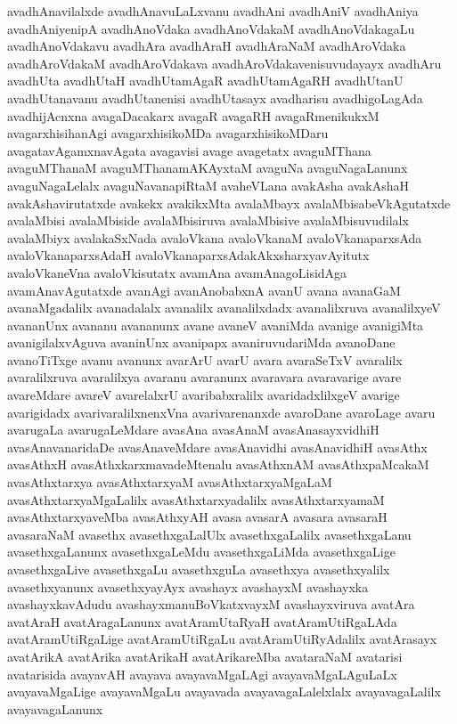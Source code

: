 {avadhAnavilalxde
avadhAnavuLaLxvanu
avadhAni
avadhAniV
avadhAniya
avadhAniyenipA
avadhAnoVdaka
avadhAnoVdakaM
avadhAnoVdakagaLu
avadhAnoVdakavu
avadhAra
avadhAraH
avadhAraNaM
avadhAroVdaka
avadhAroVdakaM
avadhAroVdakava
avadhAroVdakavenisuvudayayx
avadhAru
avadhUta
avadhUtaH
avadhUtamAgaR
avadhUtamAgaRH
avadhUtanU
avadhUtanavanu
avadhUtanenisi
avadhUtasayx
avadharisu
avadhigoLagAda
avadhijAcnxna
avagaDacakarx
avagaR
avagaRH
avagaRmenikukxM
avagarxhisihanAgi
avagarxhisikoMDa
avagarxhisikoMDaru
avagatavAgamxnavAgata
avagavisi
avage
avagetatx
avaguMThana
avaguMThanaM
avaguMThanamAKAyxtaM
avaguNa
avaguNagaLanunx
avaguNagaLelalx
avaguNavanapiRtaM
avaheVLana
avakAsha
avakAshaH
avakAshavirutatxde
avakekx
avakikxMta
avalaMbayx
avalaMbisabeVkAgutatxde
avalaMbisi
avalaMbiside
avalaMbisiruva
avalaMbisive
avalaMbisuvudilalx
avalaMbiyx
avalakaSxNada
avaloVkana
avaloVkanaM
avaloVkanaparxsAda
avaloVkanaparxsAdaH
avaloVkanaparxsAdakAkxsharxyavAyitutx
avaloVkaneVna
avaloVkisutatx
avamAna
avamAnagoLisidAga
avamAnavAgutatxde
avanAgi
avanAnobabxnA
avanU
avana
avanaGaM
avanaMgadalilx
avanadalalx
avanalilx
avanalilxdadx
avanalilxruva
avanalilxyeV
avananUnx
avananu
avananunx
avane
avaneV
avaniMda
avanige
avanigiMta
avanigilalxvAguva
avaninUnx
avanipapx
avaniruvudariMda
avanoDane
avanoTiTxge
avanu
avanunx
avarArU
avarU
avara
avaraSeTxV
avaralilx
avaralilxruva
avaralilxya
avaranu
avaranunx
avaravara
avaravarige
avare
avareMdare
avareV
avarelalxrU
avaribabxralilx
avaridadxlilxgeV
avarige
avarigidadx
avarivaralilxnenxVna
avarivarenanxde
avaroDane
avaroLage
avaru
avarugaLa
avarugaLeMdare
avasAna
avasAnaM
avasAnasayxvidhiH
avasAnavanaridaDe
avasAnaveMdare
avasAnavidhi
avasAnavidhiH
avasAthx
avasAthxH
avasAthxkarxmavadeMtenalu
avasAthxnAM
avasAthxpaMcakaM
avasAthxtarxya
avasAthxtarxyaM
avasAthxtarxyaMgaLaM
avasAthxtarxyaMgaLalilx
avasAthxtarxyadalilx
avasAthxtarxyamaM
avasAthxtarxyaveMba
avasAthxyAH
avasa
avasarA
avasara
avasaraH
avasaraNaM
avasethx
avasethxgaLalUlx
avasethxgaLalilx
avasethxgaLanu
avasethxgaLanunx
avasethxgaLeMdu
avasethxgaLiMda
avasethxgaLige
avasethxgaLive
avasethxgaLu
avasethxguLa
avasethxya
avasethxyalilx
avasethxyanunx
avasethxyayAyx
avashayx
avashayxM
avashayxka
avashayxkavAdudu
avashayxmanuBoVkatxvayxM
avashayxviruva
avatAra
avatAraH
avatAragaLanunx
avatAramUtaRyaH
avatAramUtiRgaLAda
avatAramUtiRgaLige
avatAramUtiRgaLu
avatAramUtiRyAdalilx
avatArasayx
avatArikA
avatArika
avatArikaH
avatArikareMba
avataraNaM
avatarisi
avatarisida
avayavAH
avayava
avayavaMgaLAgi
avayavaMgaLAguLaLx
avayavaMgaLige
avayavaMgaLu
avayavada
avayavagaLalelxlalx
avayavagaLalilx
avayavagaLanunx
}

